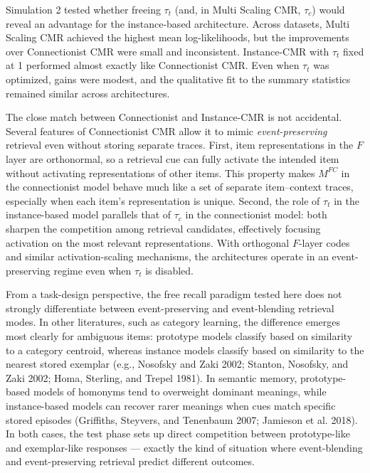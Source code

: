 \documentclass[
  letterpaper,
  11pt,
  english,
  singlespacing,
  headsepline]{MastersDoctoralThesis}
\begin{document}
Simulation 2 tested whether freeing \(\tau_t\) (and, in Multi Scaling
CMR, \(\tau_c\)) would reveal an advantage for the instance-based
architecture. Across datasets, Multi Scaling CMR achieved the highest
mean log-likelihoods, but the improvements over Connectionist CMR were
small and inconsistent. Instance-CMR with \(\tau_t\) fixed at 1
performed almost exactly like Connectionist CMR. Even when \(\tau_t\)
was optimized, gains were modest, and the qualitative fit to the summary
statistics remained similar across architectures.

The close match between Connectionist and Instance-CMR is not
accidental. Several features of Connectionist CMR allow it to mimic
\emph{event-preserving} retrieval even without storing separate traces.
First, item representations in the \(F\) layer are orthonormal, so a
retrieval cue can fully activate the intended item without activating
representations of other items. This property makes \(M^{FC}\) in the
connectionist model behave much like a set of separate item--context
traces, especially when each item's representation is unique. Second,
the role of \(\tau_t\) in the instance-based model parallels that of
\(\tau_c\) in the connectionist model: both sharpen the competition
among retrieval candidates, effectively focusing activation on the most
relevant representations. With orthogonal \(F\)-layer codes and similar
activation-scaling mechanisms, the architectures operate in an
event-preserving regime even when \(\tau_t\) is disabled.

From a task-design perspective, the free recall paradigm tested here
does not strongly differentiate between event-preserving and
event-blending retrieval modes. In other literatures, such as category
learning, the difference emerges most clearly for ambiguous items:
prototype models classify based on similarity to a category centroid,
whereas instance models classify based on similarity to the nearest
stored exemplar (e.g., Nosofsky and Zaki 2002; Stanton, Nosofsky, and
Zaki 2002; Homa, Sterling, and Trepel 1981). In semantic memory,
prototype-based models of homonyms tend to overweight dominant meanings,
while instance-based models can recover rarer meanings when cues match
specific stored episodes (Griffiths, Steyvers, and Tenenbaum 2007;
Jamieson et al. 2018). In both cases, the test phase sets up direct
competition between prototype-like and exemplar-like responses ---
exactly the kind of situation where event-blending and event-preserving
retrieval predict different outcomes.
\end{document}
